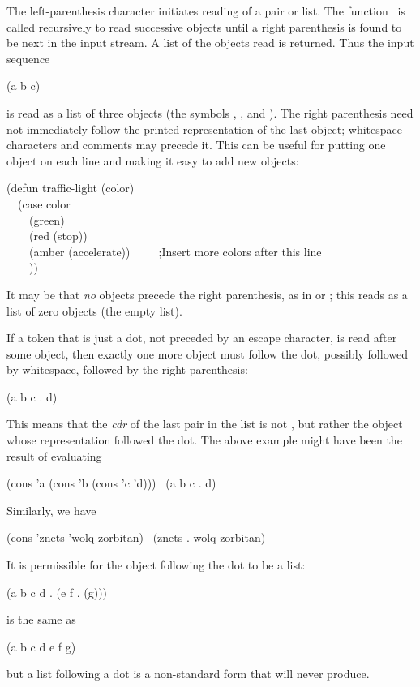 \begin{flushdesc}
\item[\cd{(}]
The left-parenthesis character initiates reading of a pair or list.
The function~ is called recursively to read successive objects
until a right parenthesis is found to be next in the input stream.
A list of the objects read is returned.  Thus the input sequence
\begin{lisp}
(a b c)
\end{lisp}
is read as a list of three objects (the symbols , , and ).
The right parenthesis need not immediately follow the printed representation of
the last object; whitespace
characters and comments may precede it.
This can be useful for putting one object
on each line and making it easy to add new objects:
\begin{lisp}
(defun traffic-light (color) \\
~~(case color \\
~~~~(green) \\
~~~~(red (stop)) \\
~~~~(amber (accelerate))~~~~~;\textrm{Insert more colors after this line} \\
~~~~))
\end{lisp}

It may be that \emph{no} objects precede the right parenthesis, as in \cd{()}
or \cd{(~)}; this reads as a list of zero objects (the empty list).

If a token that is just a dot,
not preceded by an escape character,
is read after some object,
then exactly one more object must follow the dot,
possibly followed by whitespace,
followed by the right parenthesis:
\begin{lisp}
(a b c . d)
\end{lisp}
This means that the \emph{cdr} of the last pair in the list is not {\nil},
but rather the object whose representation followed the dot.
The above example might have been the result of evaluating
\begin{lisp}
(cons 'a (cons 'b (cons 'c 'd))) \EV\ (a b c . d)
\end{lisp}
Similarly, we have
\begin{lisp}
(cons 'znets 'wolq-zorbitan) \EV\ (znets . wolq-zorbitan)
\end{lisp}
It is permissible for the object following the dot to be a list:
\begin{lisp}
(a b c d . (e f . (g)))
\end{lisp}
is the same as
\begin{lisp}
(a b c d e f g)
\end{lisp}
but a list following a dot
is a non-standard form that  will never produce.


\end{flushdesc}
